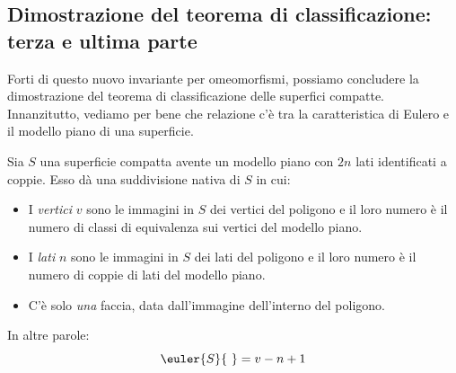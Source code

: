 \subsection{Dimostrazione del teorema di classificazione: terza e ultima parte}
Forti di questo nuovo invariante per omeomorfismi, possiamo concludere la dimostrazione del teorema di classificazione delle superfici compatte.\\ Innanzitutto, vediamo per bene che relazione c'è tra la caratteristica di Eulero e il modello piano di una superficie.
\begin{observe}
	Sia $S$ una superficie compatta avente un modello piano con $2n$ lati identificati a coppie. Esso dà una suddivisione nativa di $S$ in cui:
	\begin{itemize}
		\item I \textit{vertici} $v$ sono le immagini in $S$ dei vertici del poligono e il loro numero è il numero di classi di equivalenza sui vertici del modello piano.
		\item I \textit{lati} $n$ sono le immagini in $S$ dei lati del poligono  e il loro numero è il numero di coppie di lati del modello piano.
		\item C'è solo \textit{una} faccia, data dall'immagine dell'interno del poligono.
	\end{itemize}
In altre parole:
\begin{equation}
	\euler{S}{\ }=v-n+1
\end{equation}
\vspace{-6mm}
\end{observe}
